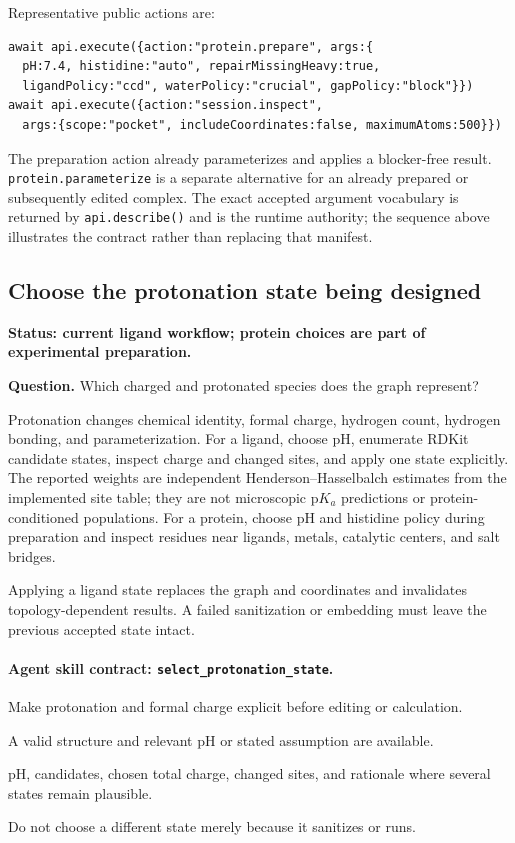 \begin{small}
Representative public actions are:

\begin{lstlisting}
await api.execute({action:"protein.prepare", args:{
  pH:7.4, histidine:"auto", repairMissingHeavy:true,
  ligandPolicy:"ccd", waterPolicy:"crucial", gapPolicy:"block"}})
await api.execute({action:"session.inspect",
  args:{scope:"pocket", includeCoordinates:false, maximumAtoms:500}})
\end{lstlisting}

The preparation action already parameterizes and applies a blocker-free result. \texttt{protein.parameterize} is a separate alternative for an already prepared or subsequently edited complex. The exact accepted argument vocabulary is returned by \texttt{api.describe()} and is the runtime authority; the sequence above illustrates the contract rather than replacing that manifest.

\subsection{Choose the protonation state being designed}\label{appB:protonation}

\textbf{Status: current ligand workflow; protein choices are part of experimental preparation.}

\textbf{Question.} Which charged and protonated species does the graph represent?

Protonation changes chemical identity, formal charge, hydrogen count, hydrogen bonding, and parameterization. For a ligand, choose pH, enumerate RDKit candidate states, inspect charge and changed sites, and apply one state explicitly. The reported weights are independent Henderson--Hasselbalch estimates from the implemented site table; they are not microscopic p$K_a$ predictions or protein-conditioned populations. For a protein, choose pH and histidine policy during preparation and inspect residues near ligands, metals, catalytic centers, and salt bridges.

Applying a ligand state replaces the graph and coordinates and invalidates topology-dependent results. A failed sanitization or embedding must leave the previous accepted state intact.

\paragraph{Agent skill contract: \texttt{select\_protonation\_state}.}

\begin{description}[leftmargin=2.2cm,style=nextline]
\item[Goal] Make protonation and formal charge explicit before editing or calculation.
\item[Preconditions] A valid structure and relevant pH or stated assumption are available.
\item[Evidence] pH, candidates, chosen total charge, changed sites, and rationale where several states remain plausible.
\item[Stop] Do not choose a different state merely because it sanitizes or runs.
\end{description}


\end{small}
